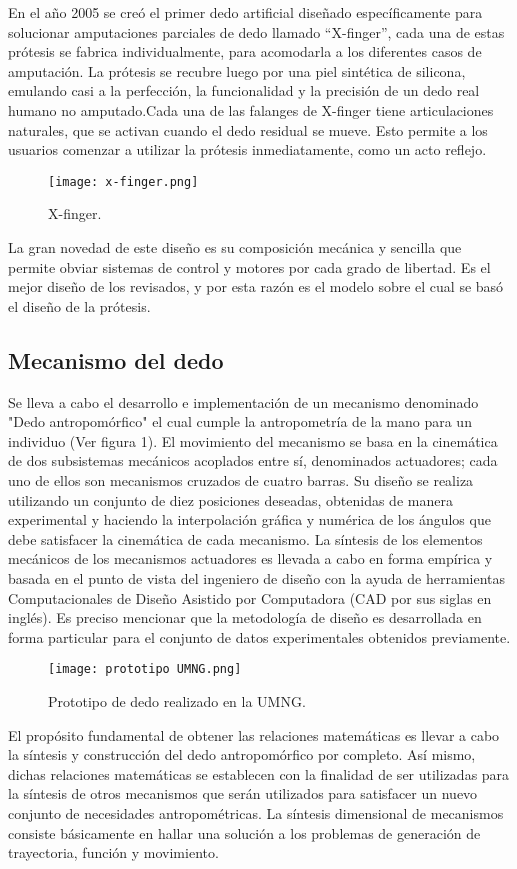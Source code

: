 \documentclass[a4paper]{article}
\begin{document}
En el año 2005 se creó el primer dedo artificial diseñado específicamente para solucionar amputaciones parciales de dedo llamado “X-finger”, cada una de estas prótesis se fabrica individualmente, para acomodarla a los diferentes casos de amputación. La prótesis se recubre luego por una piel sintética de silicona, emulando casi a la perfección, la funcionalidad y la precisión de un dedo real humano no amputado.Cada una de las falanges de X-finger tiene articulaciones naturales, que se activan cuando el dedo residual se mueve. Esto permite a los usuarios comenzar a utilizar la prótesis inmediatamente, como un acto reflejo\cite{ff5}.  

\begin{figure}[h]
\centering
\texttt{[image: x-finger.png]}
\caption{\label{fig:biomec1}X-finger.}
\end{figure}
La gran novedad de este diseño es su composición mecánica y sencilla que permite obviar sistemas de control y motores por cada grado de libertad. Es el mejor diseño de los revisados, y por esta razón es el modelo sobre el cual se basó el diseño de la prótesis. 

\subsection{Mecanismo del dedo}
Se lleva a cabo el desarrollo e implementación de un mecanismo denominado "Dedo an­tropomórfico" el cual cumple la antropometría de la mano para un individuo (Ver figura 1). El movimiento del mecanismo se basa en la cinemática de dos subsistemas mecánicos acoplados entre sí, denominados actuadores; cada uno de ellos son mecanismos cruzados de cuatro barras. Su diseño se realiza utilizando un conjunto de diez posiciones deseadas, obtenidas de manera experimental y haciendo la interpolación gráfica y numérica de los ángulos que debe satisfacer la cinemática de cada mecanismo. La síntesis de los elementos mecánicos de los mecanismos actuadores es llevada a cabo en forma empírica y basada en el punto de vista del ingeniero de diseño con la ayuda de herramientas Computacionales de Diseño Asistido por Computadora (CAD por sus siglas en inglés). Es preciso mencionar que la metodología de diseño es desarrollada en forma particular para el conjunto de datos experimentales obtenidos previamente\cite{ff2}. 

\begin{figure}[h]
\centering
\texttt{[image: prototipo UMNG.png]}
\caption{\label{fig:biomec1}Prototipo de dedo realizado en la UMNG.}
\end{figure}
El propósito fundamental de obtener las relaciones matemáticas es llevar a cabo la síntesis y construcción del dedo antropomórfico por completo. Así mismo, dichas relaciones matemáticas se establecen con la finalidad de ser utilizadas para la síntesis de otros mecanismos que serán utilizados para satisfacer un nuevo conjunto de necesidades antropométricas. La síntesis dimensional de mecanismos consiste básicamente en hallar una solución a los problemas de generación de trayectoria, función y movimiento. 
\end{document}

